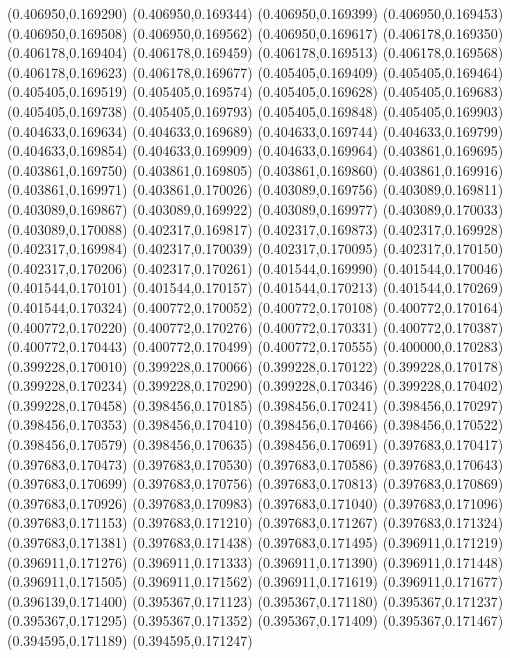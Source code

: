 (0.406950,0.169290)
(0.406950,0.169344)
(0.406950,0.169399)
(0.406950,0.169453)
(0.406950,0.169508)
(0.406950,0.169562)
(0.406950,0.169617)
(0.406178,0.169350)
(0.406178,0.169404)
(0.406178,0.169459)
(0.406178,0.169513)
(0.406178,0.169568)
(0.406178,0.169623)
(0.406178,0.169677)
(0.405405,0.169409)
(0.405405,0.169464)
(0.405405,0.169519)
(0.405405,0.169574)
(0.405405,0.169628)
(0.405405,0.169683)
(0.405405,0.169738)
(0.405405,0.169793)
(0.405405,0.169848)
(0.405405,0.169903)
(0.404633,0.169634)
(0.404633,0.169689)
(0.404633,0.169744)
(0.404633,0.169799)
(0.404633,0.169854)
(0.404633,0.169909)
(0.404633,0.169964)
(0.403861,0.169695)
(0.403861,0.169750)
(0.403861,0.169805)
(0.403861,0.169860)
(0.403861,0.169916)
(0.403861,0.169971)
(0.403861,0.170026)
(0.403089,0.169756)
(0.403089,0.169811)
(0.403089,0.169867)
(0.403089,0.169922)
(0.403089,0.169977)
(0.403089,0.170033)
(0.403089,0.170088)
(0.402317,0.169817)
(0.402317,0.169873)
(0.402317,0.169928)
(0.402317,0.169984)
(0.402317,0.170039)
(0.402317,0.170095)
(0.402317,0.170150)
(0.402317,0.170206)
(0.402317,0.170261)
(0.401544,0.169990)
(0.401544,0.170046)
(0.401544,0.170101)
(0.401544,0.170157)
(0.401544,0.170213)
(0.401544,0.170269)
(0.401544,0.170324)
(0.400772,0.170052)
(0.400772,0.170108)
(0.400772,0.170164)
(0.400772,0.170220)
(0.400772,0.170276)
(0.400772,0.170331)
(0.400772,0.170387)
(0.400772,0.170443)
(0.400772,0.170499)
(0.400772,0.170555)
(0.400000,0.170283)
(0.399228,0.170010)
(0.399228,0.170066)
(0.399228,0.170122)
(0.399228,0.170178)
(0.399228,0.170234)
(0.399228,0.170290)
(0.399228,0.170346)
(0.399228,0.170402)
(0.399228,0.170458)
(0.398456,0.170185)
(0.398456,0.170241)
(0.398456,0.170297)
(0.398456,0.170353)
(0.398456,0.170410)
(0.398456,0.170466)
(0.398456,0.170522)
(0.398456,0.170579)
(0.398456,0.170635)
(0.398456,0.170691)
(0.397683,0.170417)
(0.397683,0.170473)
(0.397683,0.170530)
(0.397683,0.170586)
(0.397683,0.170643)
(0.397683,0.170699)
(0.397683,0.170756)
(0.397683,0.170813)
(0.397683,0.170869)
(0.397683,0.170926)
(0.397683,0.170983)
(0.397683,0.171040)
(0.397683,0.171096)
(0.397683,0.171153)
(0.397683,0.171210)
(0.397683,0.171267)
(0.397683,0.171324)
(0.397683,0.171381)
(0.397683,0.171438)
(0.397683,0.171495)
(0.396911,0.171219)
(0.396911,0.171276)
(0.396911,0.171333)
(0.396911,0.171390)
(0.396911,0.171448)
(0.396911,0.171505)
(0.396911,0.171562)
(0.396911,0.171619)
(0.396911,0.171677)
(0.396139,0.171400)
(0.395367,0.171123)
(0.395367,0.171180)
(0.395367,0.171237)
(0.395367,0.171295)
(0.395367,0.171352)
(0.395367,0.171409)
(0.395367,0.171467)
(0.394595,0.171189)
(0.394595,0.171247)

